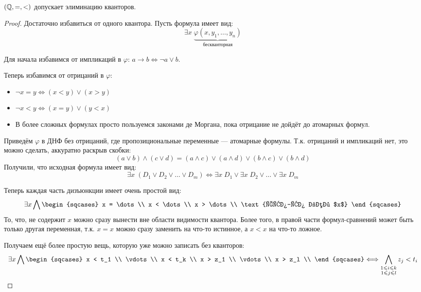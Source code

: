 \begin{theorem}
    $(\mathbb{Q}, =, <)$ допускает элиминацию кванторов.
\end{theorem}
\begin{proof} 
    Достаточно избавиться от одного квантора. Пусть формула имеет вид: $$\exists x \; \underbrace{\varphi(x, y_1, \dots, y_n)}_{\text{бескванторная}}$$

    Для начала избавимся от импликаций в $\varphi$:
    $a \to b \Leftrightarrow \lnot a \vee b$.

    Теперь избавимся от отрицаний в $\varphi$:
    \begin{itemize}
        \item $\lnot x = y \Leftrightarrow (x < y) \vee (x > y)$
        \item $\lnot x < y \Leftrightarrow (x = y) \vee (y < x)$
        \item В более сложных формулах просто пользуемся законами де Моргана, пока отрицание не дойдёт до атомарных формул.
    \end{itemize}

    Приведём $\varphi$ в ДНФ без отрицаний, где пропозициональные переменные --- атомарные формулы. Т.к. отрицаний и импликаций нет, это можно сделать, аккуратно раскрыв скобки: 
    $$(a \vee b) \wedge (c \vee d) = (a \wedge c) \vee (a \wedge d) \vee (b \wedge c) \vee (b \wedge d) $$
    Получили, что исходная формула имеет вид:
    $$\exists x \; (D_1 \vee D_2 \vee \dots \vee D_m) \Longleftrightarrow \exists x \; D_1 \vee \exists x \; D_2 \vee \dots \vee \exists x \; D_m$$

    Теперь каждая часть дизъюнкции имеет очень простой вид:
    $$ \exists x \bigwedge \begin{sqcases}
        x = \dots \\
        x < \dots \\
        x > \dots \\
        \text{что-то без $x$}
    \end{sqcases}$$
    То, что, не содержит $x$ можно сразу вынести вне области видимости квантора. Более того, в правой части формул-сравнений может быть только другая переменная, т.к. $x = x$ можно сразу заменить на что-то истинное, а $x < x$ на что-то ложное.
    
    Получаем ещё более простую вещь, которую уже можно записать без кванторов:
    $$ \exists x \bigwedge \begin{sqcases}
        x < t_1 \\
        \vdots \\
        x < t_k \\
        x > z_1 \\
        \vdots \\
        x > z_l \\
    \end{sqcases}
    \Longleftrightarrow
    \bigwedge_{\substack{1 \leqslant i \leqslant k \\ 1 \leqslant j \leqslant l}} z_j < t_i$$ 
\end{proof}
